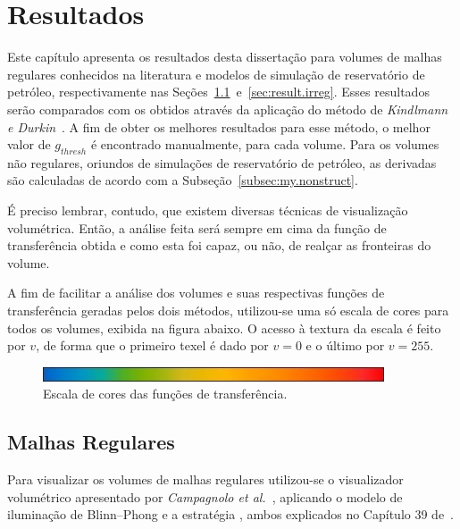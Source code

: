 
\chapter{Resultados}
\label{ch:result}

	Este capítulo apresenta os resultados desta dissertação para volumes de malhas regulares conhecidos na literatura e modelos de simulação de reservatório de petróleo, respectivamente nas Seções~\ref{sec:result.reg}~e~\ref{sec:result.irreg}. Esses resultados serão comparados com os obtidos através da aplicação do método de \textit{Kindlmann e Durkin}~\cite{gordon}. A fim de obter os melhores resultados para esse método, o melhor valor de $ g_{thresh} $ é encontrado manualmente, para cada volume. Para os volumes não regulares, oriundos de simulações de reservatório de petróleo, as derivadas são calculadas de acordo com a Subseção~\ref{subsec:my.nonstruct}.
	
	É preciso lembrar, contudo, que existem diversas técnicas de visualização volumétrica. Então, a análise feita será sempre em cima da função de transferência obtida e como esta foi capaz, ou não, de realçar as fronteiras do volume.
	
	A fim de facilitar a análise dos volumes e suas respectivas funções de transferência geradas pelos dois métodos, utilizou-se uma só escala de cores para todos os volumes, exibida na figura abaixo. O acesso à textura da escala é feito por $ v $, de forma que o primeiro texel é dado por $ v = 0 $ e o último por $ v = 255 $.

\begin{figure}[h]
	\centering
	\includegraphics[width=0.9\textwidth]{images/r_colorscale}
	\caption{Escala de cores das funções de transferência.}
\end{figure}

\section{Malhas Regulares}
\label{sec:result.reg}

	Para visualizar os volumes de malhas regulares utilizou-se o visualizador volumétrico apresentado por \textit{Campagnolo et al.}~\cite{lqc}, aplicando o modelo de iluminação de Blinn--Phong e a estratégia , ambos explicados no Capítulo 39 de~\cite{gems}.

